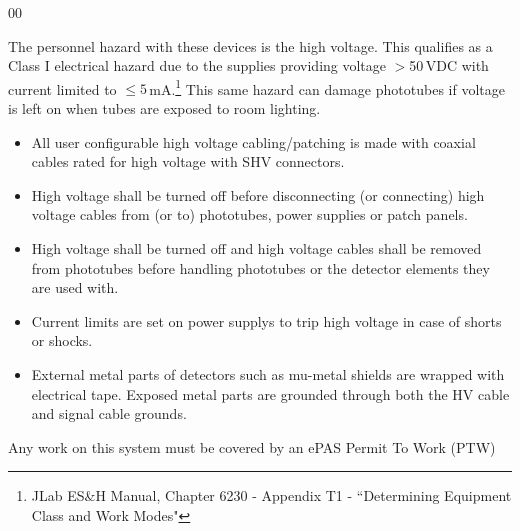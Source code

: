 \begin{safetyen}{0}{0}

The personnel hazard with these devices is the high voltage.
This qualifies as a Class I electrical hazard due to the supplies providing
voltage $>$50\,VDC with current limited to $\leq 5$\,mA.\footnote{JLab ES\&H
  Manual, Chapter 6230 - Appendix T1 - ``Determining Equipment Class and Work
  Modes"}
This same hazard can damage phototubes if voltage is left on when tubes are exposed to room
lighting.

\begin{itemize}
  \item All user configurable high voltage cabling/patching is made with
  coaxial cables rated for high voltage with SHV connectors.
  \item High voltage shall be turned off before disconnecting (or connecting)
  high voltage cables from (or to) phototubes, power supplies or patch panels.
  \item High voltage shall be turned off and high voltage cables shall
  be removed from phototubes before handling phototubes or the detector
  elements they are used with.
  \item Current limits are set on power supplys to trip high voltage in case
  of shorts or shocks.
  \item External metal parts of detectors such as mu-metal shields are wrapped
  with electrical tape.  Exposed metal parts are grounded through both the HV
  cable and signal cable grounds.
\end{itemize}
Any work on this system must be covered by an ePAS Permit To Work (PTW)



\end{safetyen}
